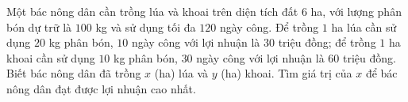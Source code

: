 \begin{baitap}%
	Một bác nông dân cần trồng lúa và khoai trên diện tích đất $6$ ha, với lượng phân bón dự trữ là $100$ kg và sử dụng tối đa $120$ ngày công. Để trồng $1$ ha lúa cần sử dụng $20$ kg phân bón, $10$ ngày công với lợi nhuận là $30$ triệu đồng; để trồng $1$ ha khoai cần sử dụng $10$ kg phân bón, $30$ ngày công với lợi nhuận là $60$ triệu đồng. Biết bác nông dân đã trồng $x$ (ha) lúa và $y$ (ha) khoai. Tìm giá trị của $x$ để bác nông dân đạt được lợi nhuận cao nhất.
\end{baitap}